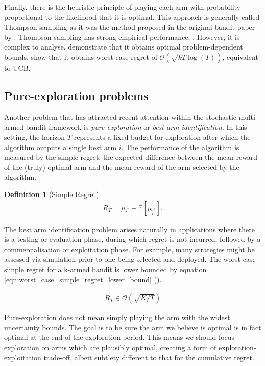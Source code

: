 \documentclass[11pt,a4paper,twoside]{report}
\newcommand{\E}[1]{\mathbb E\left[{#1}\right]}
\newcommand{\eqn}[1]{\begin{align}#1\end{align}}
\newcommand{\bigo}[1]{\mathcal{O}\left( #1 \right)}
\newcommand{\simpleregret}{R_T}
\theoremstyle{plain}
\theoremstyle{definition}
\newtheorem{definition}[theorem]{Definition}
\begin{document}
Finally, there is the heuristic principle of playing each arm with probability proportional to the likelihood that it is optimal. This approach is generally called Thompson sampling as it was the method proposed in the original bandit paper by \citet{Thompson1993}. Thompson sampling has strong empirical performance, \citep{chapelle2011empirical}. However, it is complex to analyse. \citet{kaufmann2012thompson} demonstrate that it obtains optimal problem-dependent bounds, \citet{agrawal2013further} show that it obtains worst case regret of $\bigo{\sqrt{kT\log(T)}}$, equivalent to UCB. 

\subsection{Pure-exploration problems}
\label{sec:pure-exploitation-problems}
Another problem that has attracted recent attention \citep{Bubeck2009,Audibert2010,Gabillon2012,Karnin2013} within the stochastic multi-armed bandit framework is \textit{pure exploration} or \textit{best arm identification}. In this setting, the horizon $T$ represents a fixed budget for exploration after which the algorithm outputs a single best arm $i$. The performance of the algorithm is measured by the simple regret; the expected difference between the mean reward of the (truly) optimal arm and the mean reward of the arm selected by the algorithm.

\vspace{0.5cm}
\begin{definition}[Simple Regret]
\eqn{
\label{eqn:simple_regret}
\simpleregret=\mu_{i^*} - \E{\mu_{\hat i^*}}.
}
\end{definition}

The best arm identification problem arises naturally in applications where there is a testing or evaluation phase, during which regret is not incurred, followed by a commercialisation or exploitation phase. For example, many strategies might be assessed via simulation prior to one being selected and deployed. The worst case simple regret for a k-armed bandit is lower bounded by equation \ref{eqn:worst_case_simple_regret_lower_bound} (\citep{Bubeck2009}).

\eqn{
\label{eqn:worst_case_simple_regret_lower_bound}
\simpleregret \in \bigo{\sqrt{K/T}}
}

Pure-exploration does not mean simply playing the arm with the widest uncertainty bounds. The goal is to be sure the arm we believe is optimal is in fact optimal at the end of the exploration period. This means we should focus exploration on arms which are plausibly optimal, creating a form of exploration-exploitation trade-off, albeit subtlety different to that for the cumulative regret. 
\end{document}
